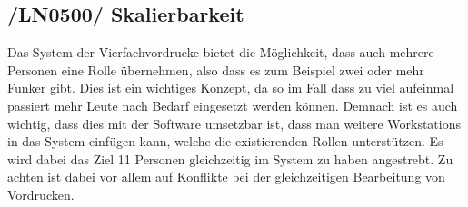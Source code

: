 \subsection{/LN0500/ Skalierbarkeit}
Das System der Vierfachvordrucke bietet die Möglichkeit, dass auch mehrere Personen eine Rolle übernehmen, also dass es zum Beispiel zwei oder mehr Funker gibt. Dies ist ein wichtiges Konzept, da so im Fall dass zu viel aufeinmal passiert mehr Leute nach Bedarf eingesetzt werden können. Demnach ist es auch wichtig, dass dies mit der Software umsetzbar ist, dass man weitere Workstations in das System einfügen kann, welche die existierenden Rollen unterstützen. Es wird dabei das Ziel 11 Personen gleichzeitig im System zu haben angestrebt. 
Zu achten ist dabei vor allem auf Konflikte bei der gleichzeitigen Bearbeitung von Vordrucken.